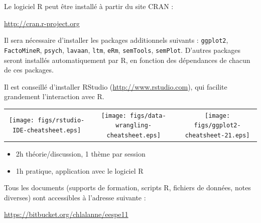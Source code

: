 Le logiciel R peut être installé à partir du site CRAN :\newline
{\centering \url{http://cran.r-project.org}\par} 

Il sera nécessaire d'installer les packages additionnels suivants :
\texttt{ggplot2}, \texttt{FactoMineR}, \texttt{psych}, \texttt{lavaan},
\texttt{ltm}, \texttt{eRm}, \texttt{semTools}, \texttt{semPlot}. D'autres
packages seront installés automatiquement par R, en fonction des dépendances de
chacun de ces packages.

Il\mark{} est conseillé d'installer RStudio (\url{http://www.rstudio.com}), qui
facilite grandement l'interaction avec R. 

\begin{tabular}{ccc}
  \texttt{[image: figs/rstudio-IDE-cheatsheet.eps]} &
  \texttt{[image: figs/data-wrangling-cheatsheet.eps]} &
  \texttt{[image: figs/ggplot2-cheatsheet-21.eps]}
\end{tabular}





\begin{itemize}
\item 2h théorie/discussion, 1 thème par session
\item 1h pratique, application avec le logiciel R
\end{itemize}

Tous les documents (supports de formation, scripts R, fichiers de données, notes
diverses) sont accessibles à l'adresse suivante :\newline 

{\centering \url{https://bitbucket.org/chlalanne/eespe11}\par}


